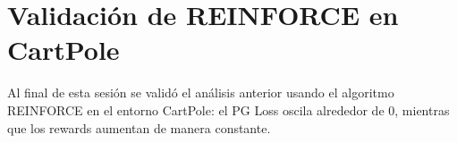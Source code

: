 \section{Validación de REINFORCE en CartPole}
Al final de esta sesión se validó el análisis anterior usando el algoritmo REINFORCE en el entorno CartPole: el PG Loss oscila alrededor de 0, mientras que los rewards aumentan de manera constante.

\newpage
